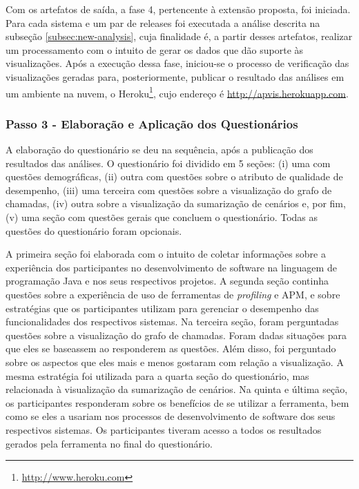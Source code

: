 Com os artefatos de saída, a fase 4, pertencente à extensão proposta, foi iniciada. Para cada sistema e um par de releases foi executada a análise descrita na subseção \ref{subsec:new-analysis}, cuja finalidade é, a partir desses artefatos, realizar um processamento com o intuito de gerar os dados que dão suporte às visualizações. Após a execução dessa fase, iniciou-se o processo de verificação das visualizações geradas para, posteriormente, publicar o resultado das análises em um ambiente na nuvem, o Heroku\footnote{\href{http://www.heroku.com}{http://www.heroku.com}}, cujo endereço é \href{http://apvis.herokuapp.com}{http://apvis.herokuapp.com}.

\subsubsection{Passo 3 - Elaboração e Aplicação dos Questionários} \label{subsec:avaliacao-procedimentos-passo-3}

A elaboração do questionário se deu na sequência, após a publicação dos resultados das análises. O questionário foi dividido em 5 seções: (i) uma com questões demográficas, (ii) outra com questões sobre o atributo de qualidade de desempenho, (iii) uma terceira com questões sobre a visualização do grafo de chamadas, (iv) outra sobre a visualização da sumarização de cenários e, por fim, (v) uma seção com questões gerais que concluem o questionário. Todas as questões do questionário foram opcionais.

A primeira seção foi elaborada com o intuito de coletar informações sobre a experiência dos participantes no desenvolvimento de software na linguagem de programação Java e nos seus respectivos projetos. A segunda seção continha questões sobre a experiência de uso de ferramentas de \textit{profiling} e APM, e sobre estratégias que os participantes utilizam para gerenciar o desempenho das funcionalidades dos respectivos sistemas. Na terceira seção, foram perguntadas questões sobre a visualização do grafo de chamadas. Foram dadas situações para que eles se baseassem ao responderem as questões. Além disso, foi perguntado sobre os aspectos que eles mais e menos gostaram com relação a visualização. A mesma estratégia foi utilizada para a quarta seção do questionário, mas relacionada à visualização da sumarização de cenários. Na quinta e última seção, os participantes responderam sobre os benefícios de se utilizar a ferramenta, bem como se eles a usariam nos processos de desenvolvimento de software dos seus respectivos sistemas. Os participantes tiveram acesso a todos os resultados gerados pela ferramenta no final do questionário.

